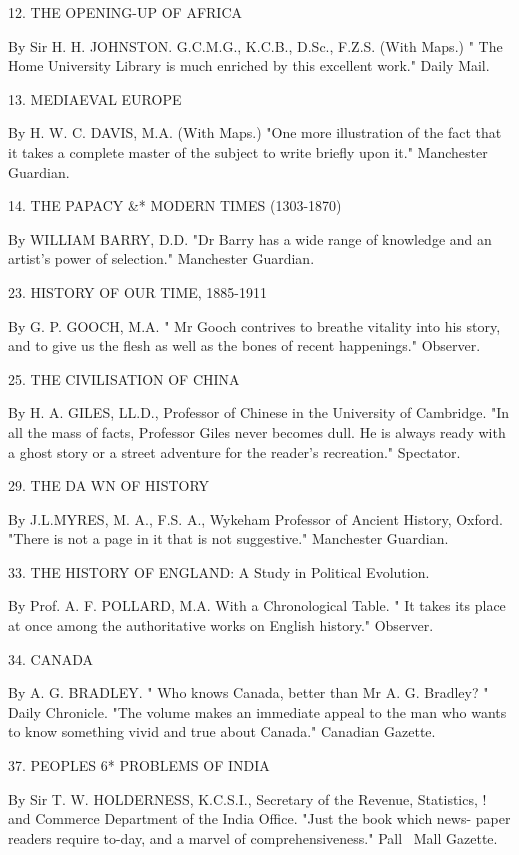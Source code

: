 \documentclass[12pt,leqno]{book}[2005/09/16]
\begin{document}
12. THE OPENING-UP OF AFRICA

By Sir H. H. JOHNSTON. G.C.M.G., K.C.B., D.Sc., F.Z.S. (With Maps.)
" The Home University Library is much enriched by this excellent work."
Daily Mail.

13. MEDIAEVAL EUROPE

By H. W. C. DAVIS, M.A. (With Maps.) "One more illustration of the
fact that it takes a complete master of the subject to write briefly upon it."
Manchester Guardian.

14. THE PAPACY \&* MODERN TIMES (1303-1870)

By WILLIAM BARRY, D.D. "Dr Barry has a wide range of knowledge
and an artist's power of selection." Manchester Guardian.

23. HISTORY OF OUR TIME, 1885-1911

By G. P. GOOCH, M.A. " Mr Gooch contrives to breathe vitality into his story,
and to give us the flesh as well as the bones of recent happenings." Observer.

25. THE CIVILISATION OF CHINA

By H. A. GILES, LL.D., Professor of Chinese in the University of Cambridge.
"In all the mass of facts, Professor Giles never becomes dull. He is always
ready with a ghost story or a street adventure for the reader's recreation."
Spectator.

29. THE DA WN OF HISTORY

By J.L.MYRES, M. A., F.S. A., Wykeham Professor of Ancient History, Oxford.
"There is not a page in it that is not suggestive." Manchester Guardian.

33. THE HISTORY OF ENGLAND:
A Study in Political Evolution.

By Prof. A. F. POLLARD, M.A. With a Chronological Table. " It takes its
place at once among the authoritative works on English history." Observer.

34. CANADA

By A. G. BRADLEY. " Who knows Canada, better than Mr A. G. Bradley? "
Daily Chronicle. "The volume makes an immediate appeal to the man who
wants to know something vivid and true about Canada." Canadian Gazette.



37. PEOPLES 6* PROBLEMS OF INDIA

By Sir T. W. HOLDERNESS, K.C.S.I., Secretary of the Revenue, Statistics,
! and Commerce Department of the India Office. "Just the book which news-
paper readers require to-day, and a marvel of comprehensiveness." Pall
\ Mall Gazette.
\end{document}
